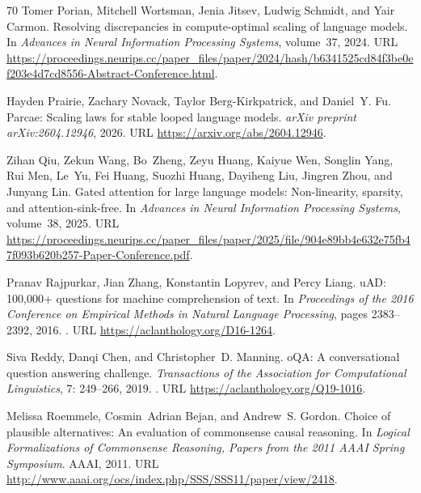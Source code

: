 \documentclass[]{bytedance_seed}
\theoremstyle{definition}
\theoremstyle{remark}
\begin{document}
\begin{thebibliography}{70}
Tomer Porian, Mitchell Wortsman, Jenia Jitsev, Ludwig Schmidt, and Yair Carmon.
\newblock Resolving discrepancies in compute-optimal scaling of language
  models.
\newblock In \emph{Advances in Neural Information Processing Systems},
  volume~37, 2024.
\newblock URL
  \url{https://proceedings.neurips.cc/paper_files/paper/2024/hash/b6341525cd84f3be0ef203e4d7cd8556-Abstract-Conference.html}.

Hayden Prairie, Zachary Novack, Taylor Berg-Kirkpatrick, and Daniel~Y. Fu.
\newblock Parcae: Scaling laws for stable looped language models.
\newblock \emph{arXiv preprint arXiv:2604.12946}, 2026.
\newblock URL \url{https://arxiv.org/abs/2604.12946}.

Zihan Qiu, Zekun Wang, Bo~Zheng, Zeyu Huang, Kaiyue Wen, Songlin Yang, Rui Men,
  Le~Yu, Fei Huang, Suozhi Huang, Dayiheng Liu, Jingren Zhou, and Junyang Lin.
\newblock Gated attention for large language models: Non-linearity, sparsity,
  and attention-sink-free.
\newblock In \emph{Advances in Neural Information Processing Systems},
  volume~38, 2025.
\newblock URL
  \url{https://proceedings.neurips.cc/paper_files/paper/2025/file/904e89bb4e632e75fb47f093b620b257-Paper-Conference.pdf}.

Pranav Rajpurkar, Jian Zhang, Konstantin Lopyrev, and Percy Liang.
u{AD}: 100,000+ questions for machine comprehension of text.
\newblock In \emph{Proceedings of the 2016 Conference on Empirical Methods in
  Natural Language Processing}, pages 2383--2392, 2016.
\newblock {}.
\newblock URL \url{https://aclanthology.org/D16-1264}.

Siva Reddy, Danqi Chen, and Christopher~D. Manning.
o{QA}: A conversational question answering challenge.
\newblock \emph{Transactions of the Association for Computational Linguistics},
  7: 249--266, 2019.
\newblock {}.
\newblock URL \url{https://aclanthology.org/Q19-1016}.

Melissa Roemmele, Cosmin~Adrian Bejan, and Andrew~S. Gordon.
\newblock Choice of plausible alternatives: An evaluation of commonsense causal
  reasoning.
\newblock In \emph{Logical Formalizations of Commonsense Reasoning, Papers from
  the 2011 AAAI Spring Symposium}. {AAAI}, 2011.
\newblock URL
  \url{http://www.aaai.org/ocs/index.php/SSS/SSS11/paper/view/2418}.


\end{thebibliography}
\end{document}
